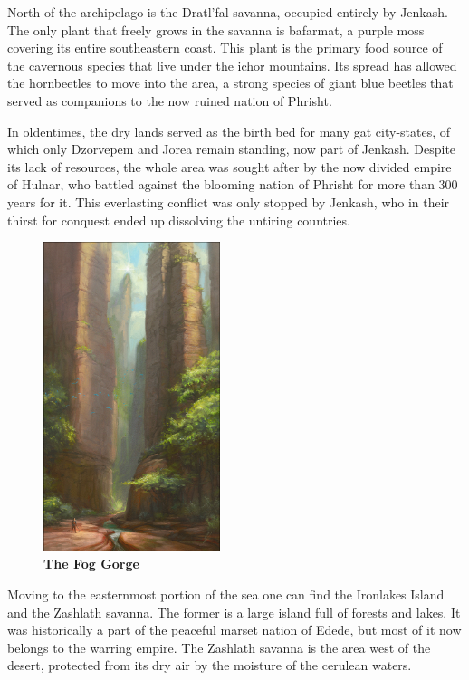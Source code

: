 North of the archipelago is the Dratl'fal savanna, occupied entirely by Jenkash.
The only plant that freely grows in the savanna is bafarmat, a purple moss covering its entire southeastern coast.
This plant is the primary food source of the cavernous species that live under the ichor mountains.
Its spread has allowed the hornbeetles to move into the area, a strong species of giant blue beetles that served as companions to the now ruined nation of Phrisht.

In oldentimes, the dry lands served as the birth bed for many gat city-states, of which only Dzorvepem and Jorea remain standing, now part of Jenkash.
Despite its lack of resources, the whole area was sought after by the now divided empire of Hulnar, who battled against the blooming nation of Phrisht for more than 300 years for it.
This everlasting conflict was only stopped by Jenkash, who in their thirst for conquest ended up dissolving the untiring countries.

\begin{figure}[t]
    \centering
    \includegraphics[width=0.46\textwidth]{01yuadrem/img/14fog_gorge.png}
    \caption*{\centering \large{\textbf{The Fog Gorge}}}
\end{figure}

Moving to the easternmost portion of the sea one can find the Ironlakes Island and the Zashlath savanna.
The former is a large island full of forests and lakes.
It was historically a part of the peaceful marset nation of Edede, but most of it now belongs to the warring empire.
The Zashlath savanna is the area west of the desert, protected from its dry air by the moisture of the cerulean waters.
